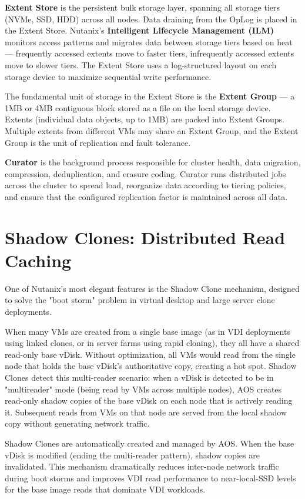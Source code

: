 \textbf{Extent Store} is the persistent bulk storage layer, spanning all storage tiers (NVMe, SSD, HDD) across all nodes. Data draining from the OpLog is placed in the Extent Store. Nutanix's \textbf{Intelligent Lifecycle Management (ILM)} monitors access patterns and migrates data between storage tiers based on heat --- frequently accessed extents move to faster tiers, infrequently accessed extents move to slower tiers. The Extent Store uses a log-structured layout on each storage device to maximize sequential write performance.

The fundamental unit of storage in the Extent Store is the \textbf{Extent Group} --- a 1MB or 4MB contiguous block stored as a file on the local storage device. Extents (individual data objects, up to 1MB) are packed into Extent Groups. Multiple extents from different VMs may share an Extent Group, and the Extent Group is the unit of replication and fault tolerance.

\textbf{Curator} is the background process responsible for cluster health, data migration, compression, deduplication, and erasure coding. Curator runs distributed jobs across the cluster to spread load, reorganize data according to tiering policies, and ensure that the configured replication factor is maintained across all data.

\section{Shadow Clones: Distributed Read Caching}
One of Nutanix's most elegant features is the Shadow Clone mechanism, designed to solve the "boot storm" problem in virtual desktop and large server clone deployments.

When many VMs are created from a single base image (as in VDI deployments using linked clones, or in server farms using rapid cloning), they all have a shared read-only base vDisk. Without optimization, all VMs would read from the single node that holds the base vDisk's authoritative copy, creating a hot spot. Shadow Clones detect this multi-reader scenario: when a vDisk is detected to be in "multireader" mode (being read by VMs across multiple nodes), AOS creates read-only shadow copies of the base vDisk on each node that is actively reading it. Subsequent reads from VMs on that node are served from the local shadow copy without generating network traffic.

Shadow Clones are automatically created and managed by AOS. When the base vDisk is modified (ending the multi-reader pattern), shadow copies are invalidated. This mechanism dramatically reduces inter-node network traffic during boot storms and improves VDI read performance to near-local-SSD levels for the base image reads that dominate VDI workloads.

